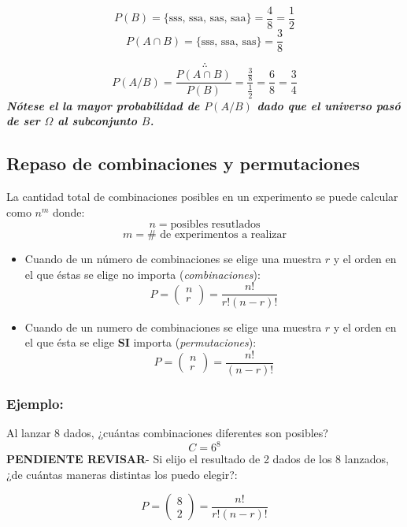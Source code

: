\documentclass[]{book}
\begin{document}
\[P(B) = \{\text{sss, ssa, sas, saa}\} = \frac{4}{8} = \frac{1}{2}\]
\[P(A\cap B) = \{\text{sss, ssa, sas}\} = \frac{3}{8}\]

\[\therefore\]
\[P(A/B) = \frac {P(A\cap B)}{P(B)} = \frac {\frac {3}{8}}{\frac {1}{2}} = \frac {6}{8} = \frac {3}{4}\]
\textbf{\emph{Nótese el la mayor probabilidad de \(P(A/B)\) dado que el
universo pasó de ser \(\Omega\) al subconjunto \(B\).}}

\subsection{\texorpdfstring{Repaso de \textbf{combinaciones} y
\textbf{permutaciones}}{Repaso de combinaciones y permutaciones}}\label{repaso-de-combinaciones-y-permutaciones-2}

 La cantidad total de combinaciones posibles en un experimento se puede
calcular como \(n^m\) donde: \[n = \text{posibles resutlados}\]
\[m = \text{# de experimentos a realizar}\]

\begin{itemize}
\item
  Cuando de un número de combinaciones se elige una muestra \(r\) y el
  orden en el que éstas se elige no importa (\emph{combinaciones}):
  \[P = \left( \begin{array}{c} n \\ r \end{array} \right) = \frac {n!}{r!(n-r)!}\]
\item
  Cuando de un numero de combinaciones se elige una muestra \(r\) y el
  orden en el que ésta se elige \textbf{SI} importa
  (\emph{permutaciones}):
  \[P = \left( \begin{array}{c} n \\ r \end{array} \right) = \frac {n!}{(n-r)!}\]
\end{itemize}

\subsubsection{Ejemplo:}\label{ejemplo-4}

Al lanzar 8 dados, ¿cuántas combinaciones diferentes son posibles?
\[C = 6^8\] \textbf{PENDIENTE REVISAR}- Si elijo el resultado de 2 dados
de los 8 lanzados, ¿de cuántas maneras distintas los puedo elegir?:

\[P = \left( \begin{array}{c} 8 \\ 2 \end{array} \right) = \frac {n!}{r!(n-r)!}\]
\end{document}
